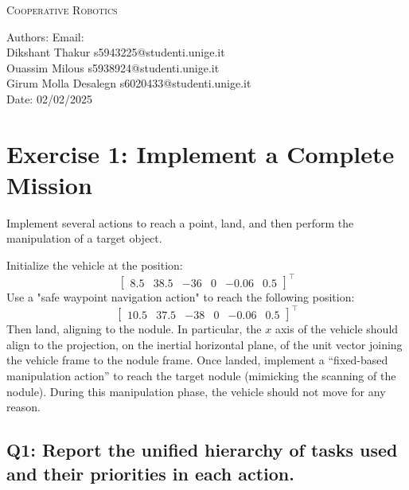 \documentclass{article}
\makeatletter
\newcommand\frontmatter{%
    \cleardoublepage
  \pagenumbering{roman}}
\makeatother
\begin{document}
\frontmatter
\onecolumn 
\vskip 1cm
\begin{center}
\huge \textsc{Cooperative Robotics}\\
\vskip 1cm

\skip 0.5cm

\vskip 5cm

\normalsize
Authors:  \hspace{7cm} Email: \\  
Dikshant Thakur \hspace{6.8cm} s5943225@studenti.unige.it\\     
Ouassim Milous \hspace{7cm}  s5938924@studenti.unige.it\\
Girum Molla Desalegn \hspace{6cm} s6020433@studenti.unige.it\\
\vskip 13cm
Date: 02/02/2025 \\
\end{center}
\clearpage
\section{Exercise 1: Implement a Complete Mission}
Implement several actions to reach a point, land, and then perform the manipulation of a target object.

Initialize the vehicle at the position:
\begin{displaymath}
	\begin{bmatrix} 8.5 & 38.5 & -36 & 0 & -0.06 & 0.5 \end{bmatrix}^\top
\end{displaymath} 
Use a "safe waypoint navigation action" to reach the following position: 
\begin{displaymath}
	\begin{bmatrix} 10.5 & 37.5 & -38 & 0 & -0.06 & 0.5 \end{bmatrix}^\top
\end{displaymath} 
Then land, aligning to the nodule. In particular, the $x$ axis of the vehicle should align to the projection, on the inertial horizontal plane, of the unit vector joining the vehicle frame to the nodule frame.
Once landed, implement a ``fixed-based manipulation action'' to reach the target nodule (mimicking the scanning of the nodule). During this manipulation phase, the vehicle should not move for any reason.



\subsection{Q1: Report the unified hierarchy of tasks used and their priorities in each action.}
\end{document}
